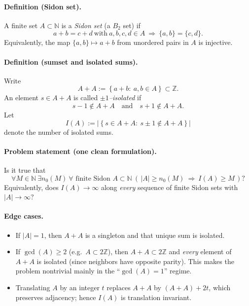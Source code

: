 \paragraph{Definition (Sidon set).}
A finite set $A\subset \mathbb{N}$ is a \emph{Sidon set} (a $B_2$ set) if
\[
a+b=c+d \ \text{with}\ a,b,c,d\in A \ \Longrightarrow\ \{a,b\}=\{c,d\}.
\]
Equivalently, the map $\{a,b\}\mapsto a+b$ from unordered pairs in $A$ is injective.

\paragraph{Definition (sumset and isolated sums).}
Write
\[
A+A := \left\{a+b:\ a,b\in A\right\}\subset \mathbb{Z}.
\]
An element $s\in A+A$ is called \emph{$\pm 1$--isolated} if
\[
s-1\notin A+A \quad\text{and}\quad s+1\notin A+A.
\]
Let
\[
I(A):=\left\lvert \left\{s\in A+A:\ s\pm 1\notin A+A\right\}\right\rvert
\]
denote the number of isolated sums.

\paragraph{Problem statement (one clean formulation).}
Is it true that
\[
\forall M\in \mathbb{N}\ \exists n_0(M)\ \forall\text{ finite Sidon }A\subset \mathbb{N}\ (\,\left\lvert A\right\rvert\ge n_0(M)\ \Rightarrow\ I(A)\ge M\,)?
\]
Equivalently, does $I(A)\to \infty$ along \emph{every} sequence of finite Sidon sets with $\left\lvert A\right\rvert\to\infty$?

\paragraph{Edge cases.}
\begin{itemize}[leftmargin=2em]
\item If $\left\lvert A\right\rvert=1$, then $A+A$ is a singleton and that unique sum is isolated.
\item If $\gcd(A)\ge 2$ (e.g.\ $A\subset 2\mathbb{Z}$), then $A+A\subset 2\mathbb{Z}$ and \emph{every} element of $A+A$ is isolated (since neighbors have opposite parity). This makes the problem nontrivial mainly in the ``$\gcd(A)=1$'' regime.
\item Translating $A$ by an integer $t$ replaces $A+A$ by $(A+A)+2t$, which preserves adjacency; hence $I(A)$ is translation invariant.
\end{itemize}
